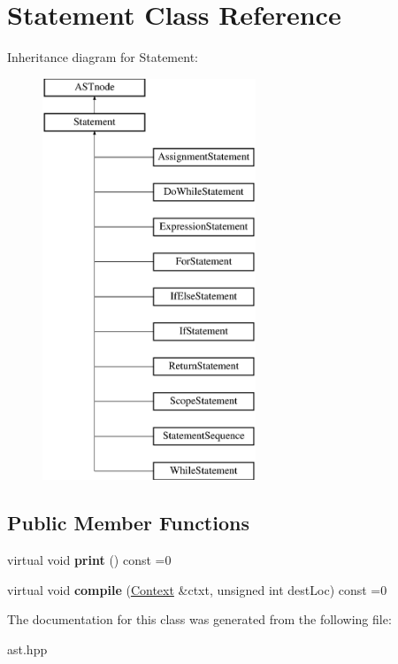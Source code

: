 \hypertarget{class_statement}{}\section{Statement Class Reference}
\label{class_statement}
Inheritance diagram for Statement\+:\begin{figure}[H]
\begin{center}
\leavevmode
\includegraphics[height=12.000000cm]{class_statement}
\end{center}
\end{figure}
\subsection*{Public Member Functions}
\begin{DoxyCompactItemize}
\item 
\mbox{\label{class_statement_a22fdc19952a84e649e0540abfdb704a0}} 
virtual void {\bfseries print} () const =0
\item 
\mbox{\label{class_statement_a9ac6b523a651324555cd3fd1dac322fc}} 
virtual void {\bfseries compile} (\hyperlink{class_context}{Context} \&ctxt, unsigned int dest\+Loc) const =0
\end{DoxyCompactItemize}


The documentation for this class was generated from the following file\+:\begin{DoxyCompactItemize}
\item 
ast.\+hpp\end{DoxyCompactItemize}
